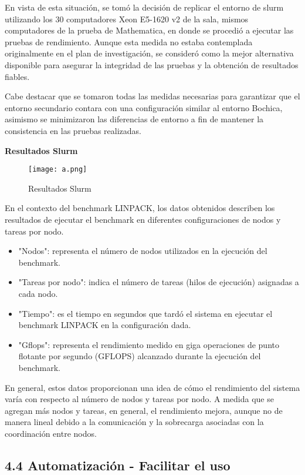 \begin{spacing}{1.5}
En vista de esta situación, se tomó la decisión de replicar el entorno de slurm utilizando los 30 computadores Xeon E5-1620 v2 de la sala, mismos computadores de la prueba de Mathematica, en donde se procedió a ejecutar las pruebas de rendimiento. Aunque esta medida no estaba contemplada originalmente en el plan de investigación, se consideró como la mejor alternativa disponible para asegurar la integridad de las pruebas y la obtención de resultados fiables.

Cabe destacar que se tomaron todas las medidas necesarias para garantizar que el entorno secundario contara con una configuración similar al entorno Bochica, asimismo se minimizaron las diferencias de entorno a fin de mantener la consistencia en las pruebas realizadas.

\textbf{Resultados Slurm}

\begin{figure}[h]
      \centering
      \texttt{[image: a.png]}
      \caption{Resultados Slurm}
      \label{fig:etiqueta}
\end{figure}

En el contexto del benchmark LINPACK, los datos obtenidos describen los resultados de ejecutar el benchmark en diferentes configuraciones de nodos y tareas por nodo.

\begin{itemize}
      \item "Nodos": representa el número de nodos utilizados en la ejecución del benchmark.
      \item "Tareas por nodo": indica el número de tareas (hilos de ejecución) asignadas a cada nodo.
      \item "Tiempo": es el tiempo en segundos que tardó el sistema en ejecutar el benchmark LINPACK en la configuración dada.
      \item "Gflops": representa el rendimiento medido en giga operaciones de punto flotante por segundo (GFLOPS) alcanzado durante la ejecución del benchmark.
\end{itemize}

En general, estos datos proporcionan una idea de cómo el rendimiento del sistema varía con respecto al número de nodos y tareas por nodo. A medida que se agregan más nodos y tareas, en general, el rendimiento mejora, aunque no de manera lineal debido a la comunicación y la sobrecarga asociadas con la coordinación entre nodos.

  \subsection{4.4 Automatización - Facilitar el uso}   \label{chap:4.4}


\end{spacing}
